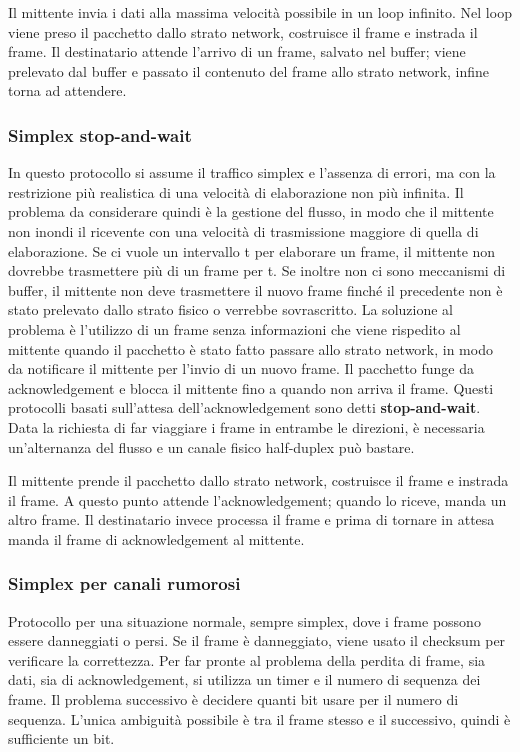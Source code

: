 Il mittente invia i dati alla massima velocità possibile in un loop infinito.
Nel loop viene preso il pacchetto dallo strato network, costruisce il frame e instrada il frame. 
Il destinatario attende l'arrivo di un frame, salvato nel buffer;
viene prelevato dal buffer e passato il contenuto del frame allo strato network, infine torna ad attendere.

\subsubsection{Simplex stop-and-wait}
In questo protocollo si assume il traffico simplex e l'assenza di errori, ma con la restrizione più realistica di una velocità di elaborazione non più infinita.
Il problema da considerare quindi è la gestione del flusso, in modo che il mittente non inondi il ricevente con una velocità di trasmissione maggiore di quella di elaborazione.
Se ci vuole un intervallo t per elaborare un frame, il mittente non dovrebbe trasmettere più di un frame per t.
Se inoltre non ci sono meccanismi di buffer, il mittente non deve trasmettere il nuovo frame finché il precedente non è stato prelevato dallo strato fisico o verrebbe sovrascritto.
La soluzione al problema è l'utilizzo di un frame senza informazioni che viene rispedito al mittente quando il pacchetto è stato fatto passare allo strato network,
in modo da notificare il mittente per l'invio di un nuovo frame.
Il pacchetto funge da acknowledgement e blocca il mittente fino a quando non arriva il frame.
Questi protocolli basati sull'attesa dell'acknowledgement sono detti \textbf{stop-and-wait}.
Data la richiesta di far viaggiare i frame in entrambe le direzioni, è necessaria un'alternanza del flusso e un canale fisico half-duplex può bastare.

Il mittente prende il pacchetto dallo strato network, costruisce il frame e instrada il frame. 
A questo punto attende l'acknowledgement; quando lo riceve, manda un altro frame.
Il destinatario invece processa il frame e prima di tornare in attesa manda il frame di acknowledgement al mittente.

\subsubsection{Simplex per canali rumorosi}
Protocollo per una situazione normale, sempre simplex, dove i frame possono essere danneggiati o persi.
Se il frame è danneggiato, viene usato il checksum per verificare la correttezza.
Per far pronte al problema della perdita di frame, sia dati, sia di acknowledgement, si utilizza un timer e il numero di sequenza dei frame.
Il problema successivo è decidere quanti bit usare per il numero di sequenza.
L'unica ambiguità possibile è tra il frame stesso e il successivo, quindi è sufficiente un bit.

